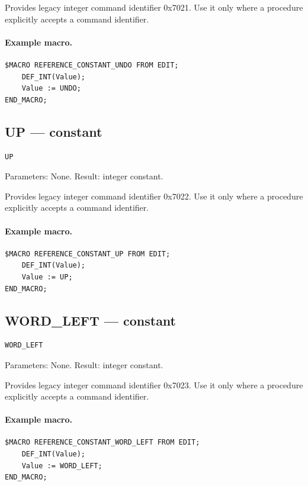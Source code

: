 \documentclass[a4paper,10pt,twoside,openany]{book}
\begin{document}
Provides legacy integer command identifier 0x7021. Use it only where a procedure explicitly accepts a command identifier.

\paragraph{Example macro.}
\begin{verbatim}
$MACRO REFERENCE_CONSTANT_UNDO FROM EDIT;
    DEF_INT(Value);
    Value := UNDO;
END_MACRO;
\end{verbatim}

\label{prim:constant-up}
\subsection*{UP --- constant}
\begin{verbatim}
UP
\end{verbatim}
Parameters: None. Result: integer constant.

Provides legacy integer command identifier 0x7022. Use it only where a procedure explicitly accepts a command identifier.

\paragraph{Example macro.}
\begin{verbatim}
$MACRO REFERENCE_CONSTANT_UP FROM EDIT;
    DEF_INT(Value);
    Value := UP;
END_MACRO;
\end{verbatim}

\label{prim:constant-word-left}
\subsection*{WORD\_LEFT --- constant}
\begin{verbatim}
WORD_LEFT
\end{verbatim}
Parameters: None. Result: integer constant.

Provides legacy integer command identifier 0x7023. Use it only where a procedure explicitly accepts a command identifier.

\paragraph{Example macro.}
\begin{verbatim}
$MACRO REFERENCE_CONSTANT_WORD_LEFT FROM EDIT;
    DEF_INT(Value);
    Value := WORD_LEFT;
END_MACRO;
\end{verbatim}
\end{document}

